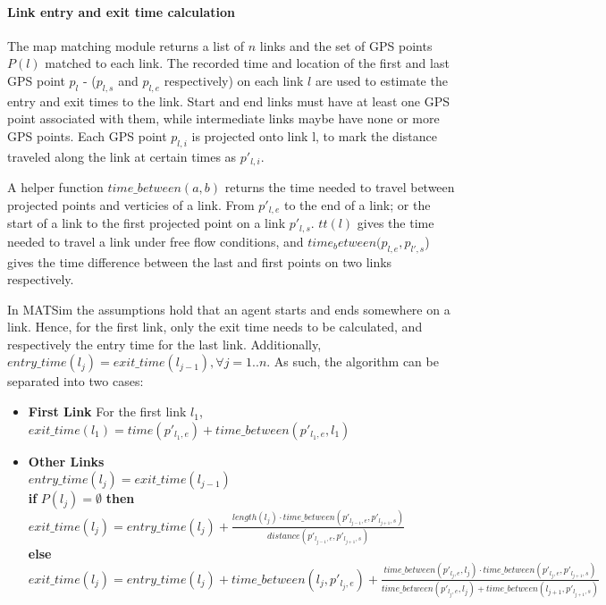 \paragraph{Link entry and exit time calculation}
The map matching module returns a list of $n$ links and the set of GPS points $P(l)$ matched to each link. The recorded time and location of the first and last GPS point $p_{l}$ - ($p_{l,s}$ and $p_{l,e}$ respectively) on each link $l$ are used to estimate the entry and exit times to the link. 
Start and end links must have at least one GPS point associated with them, while intermediate links maybe have none or more GPS points. 
Each GPS point $p_{l,i}$ is projected onto link l, to mark the distance traveled along the link at certain times as $p'_{l,i}$.

A helper function $time\_between(a,b)$ returns the time needed to travel between projected points and verticies of a link. From $p'_{l,e}$ to the end of a link; or the start of a link to the first projected point on a link $p'_{l,s}$. 
$tt(l)$ gives the time needed to travel a link under free flow conditions, and $time_between(p_{l,e}, p_{l',s}$) gives the time difference between the last and first points on two links respectively.

In MATSim the assumptions hold that an agent starts and ends somewhere on a link. Hence, for the first link, only the exit time needs to be calculated, and respectively the entry time for the last link. Additionally, $entry\_time(l_{j}) = exit\_time(l_{j-1}),  \forall j = 1..n$. As such, the algorithm can be separated into two cases:
\begin{itemize}
	\item \textbf{First Link} For the first link $l_1$, $exit\_time(l_1) = time(p'_{l_1,e}) + time\_between(p'_{l_1,e}, l_1)$
	\item \textbf{Other Links} \\
		$entry\_time(l_{j}) = exit\_time(l_{j-1}) $ \\
		\textbf{if} $P(l_j) = \emptyset$ \textbf{then} $exit\_time(l_j) = entry\_time(l_j) + 
										\frac{length(l_j) \cdot time\_between(p'_{l_{j-1},e}, p'_{l_{j+1},s})}{distance(p'_{l_{j-1},e}, p'_{l_{j+1},s})} $ \\
		\textbf{else}  $exit\_time(l_j) = entry\_time(l_j) + time\_between(l_{j}, p'_{l_j,e}) + \frac{time\_between(p'_{l_j,e}, l_{j}) \cdot time\_between(p'_{l_j,e}, p'_{l_{j+1},s})} 
					{time\_between(p'_{l_j,e}, l_{j}) + time\_between(l_{j+1},p'_{l_{j+1},s})}   $ \\
\end{itemize}

